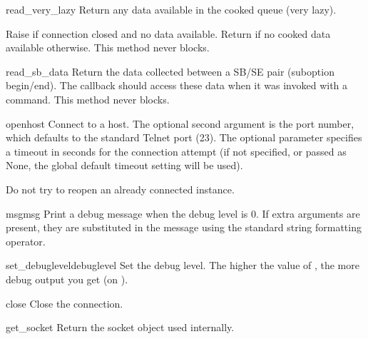 \begin{methoddesc}[Telnet]{read_very_lazy}{}
Return any data available in the cooked queue (very lazy).

Raise  if connection closed and no data available.
Return  if no cooked data available otherwise.  This method
never blocks.
\end{methoddesc}

\begin{methoddesc}[Telnet]{read_sb_data}{}
Return the data collected between a SB/SE pair (suboption begin/end).
The callback should access these data when it was invoked with a
 command. This method never blocks.

\end{methoddesc}

\begin{methoddesc}[Telnet]{open}{host}
Connect to a host.
The optional second argument is the port number, which
defaults to the standard Telnet port (23).
The optional  parameter specifies a timeout in seconds for the
connection attempt (if not specified, or passed as None, the global default
timeout setting will be used).

Do not try to reopen an already connected instance.
\end{methoddesc}

\begin{methoddesc}[Telnet]{msg}{msg}
Print a debug message when the debug level is \code{>} 0.
If extra arguments are present, they are substituted in the
message using the standard string formatting operator.
\end{methoddesc}

\begin{methoddesc}[Telnet]{set_debuglevel}{debuglevel}
Set the debug level.  The higher the value of , the
more debug output you get (on ).
\end{methoddesc}

\begin{methoddesc}[Telnet]{close}{}
Close the connection.
\end{methoddesc}

\begin{methoddesc}[Telnet]{get_socket}{}
Return the socket object used internally.
\end{methoddesc}

